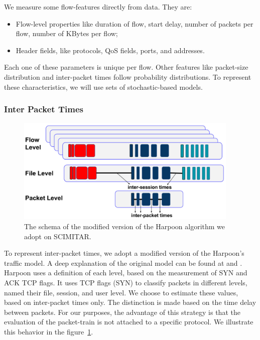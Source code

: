 We measure some flow-features directly from data. They are:  

\begin{itemize}
\item Flow-level properties like duration of flow, start delay, number of packets per flow, number of KBytes per flow; 
\item Header fields, like protocols, QoS fields, ports, and addresses.
\end{itemize}

Each one of these parameters is unique per flow. Other features like packet-size distribution and inter-packet times follow probability distributions.  To represent these characteristics, we will use sets of stochastic-based models.  


\subsubsection{Inter Packet Times}

\begin{figure}[ht!]
    \centering
    \includegraphics[height=2.0in]{figures/ch3/modified-harpoon-model}
    \caption{The schema of the modified version of the Harpoon algorithm we adopt on SCIMITAR.}
    \label{fig:modified-harpoon-model}
\end{figure}


To represent inter-packet times, we adopt a modified version of the Harpoon's traffic model. A deep explanation of the original model can be found at \cite{harpoon-paper} and \cite{harpoon-validation}. Harpoon uses a definition of each level, based on the measurement of SYN and ACK TCP flags. It uses TCP flags (SYN) to classify packets in different levels, named their file, session, and user level. We choose to estimate these values, based on inter-packet times only. The distinction is made based on the time delay between packets. For our purposes, the advantage of this strategy is that the evaluation of the packet-train is not attached to a specific protocol. We illustrate this behavior in the figure~\ref{fig:modified-harpoon-model}.


